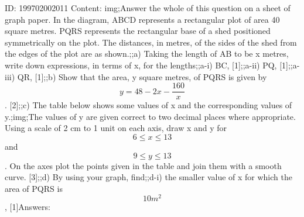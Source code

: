 \documentclass{article}
\begin{document}
ID: 199702002011
Content:
img;Answer the whole of this question on a sheet of graph paper. In the diagram, ABCD represents a rectangular plot of area 40 square metres. PQRS represents the rectangular base of a shed positioned symmetrically on the plot. The distances, in metres, of the sides of the shed from the edges of the plot are as shown.;;a) Taking the length of AB to be x metres, write down expressions, in terms of x, for the lengths;;a-i) BC, [1];;a-ii) PQ, [1];;a-iii) QR, [1];;b) Show that the area, y square metres, of PQRS is given by $$y=48-2x-\frac{160}{x}$$. [2];;c) The table below shows some values of x and the corresponding values of y.;img;The values of y are given correct to two decimal places where appropriate. Using a scale of 2 cm to 1 unit on each axis, draw x and y for $$6\leq x\leq 13$$ and $$9\leq y\leq 13$$. On the axes plot the points given in the table and join them with a smooth curve. [3];;d) By using your graph, find;;d-i) the smaller value of x for which the area of PQRS is $$10m^2$$, [1]Answers:
\end{document}
